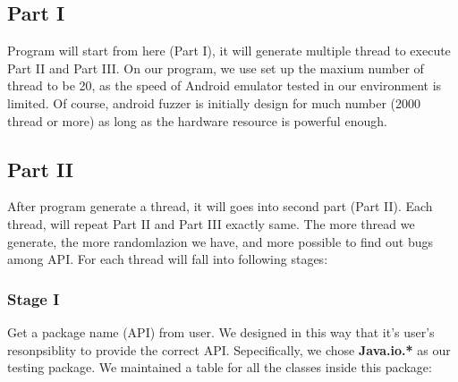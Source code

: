 \documentclass{article}
\begin{document}
\subsection{Part I}
Program will start from here (Part I), it will generate multiple thread to 
execute Part II and Part III. On our program, we use set up the maxium number 
of thread to be 20, as the speed of Android emulator tested in our environment
 is limited. Of course, android fuzzer is initially design for much number 
(2000 thread or more) as long as the hardware resource is powerful enough. \\

\subsection{Part II} 
After program generate a thread, it will goes into second part (Part II). 
Each thread, will repeat Part II and Part III exactly same. The more thread 
we generate, the more randomlazion we have, and more possible to find out 
bugs among API. For each thread will fall into following stages:

\subsubsection{Stage I}
Get a package name (API) from user. We designed in this way that it's user's 
resonpsiblity to provide the correct API. Sepecifically, we chose 
{\bf \small \ttfamily Java.io.*} as our testing package. We maintained a table 
for all the classes inside this package: \\
\end{document}
